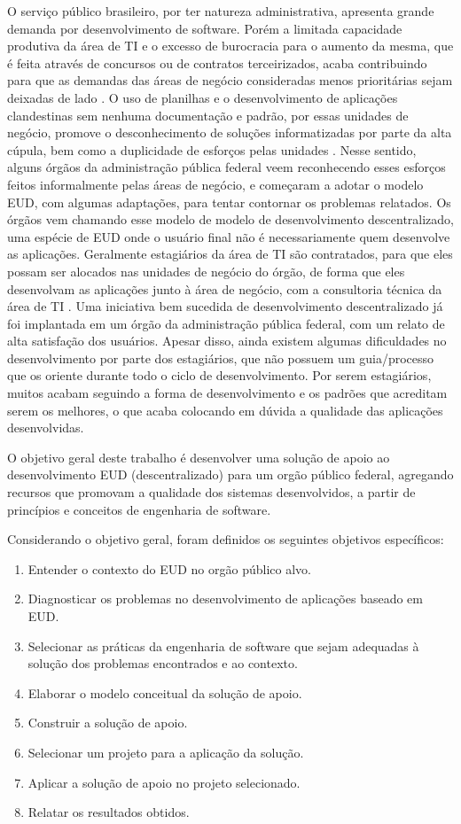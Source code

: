 O serviço público brasileiro, por ter natureza administrativa, apresenta grande demanda por desenvolvimento de software. Porém a limitada capacidade produtiva da área de TI e o excesso de burocracia para o aumento da mesma, que é feita através de concursos ou de contratos terceirizados, acaba contribuindo para que as demandas das áreas de negócio consideradas menos prioritárias sejam deixadas de lado \cite{artigoTcuGovTI}. O uso de planilhas e o desenvolvimento de aplicações clandestinas sem nenhuma documentação e padrão, por essas unidades de negócio, promove o desconhecimento de soluções informatizadas por parte da alta cúpula, bem como a duplicidade de esforços pelas unidades \cite{slideTCU}. Nesse sentido, alguns órgãos da administração pública federal veem reconhecendo esses esforços feitos informalmente pelas áreas de negócio, e começaram a adotar o modelo EUD, com algumas adaptações, para tentar contornar os problemas relatados. Os órgãos vem chamando esse modelo de modelo de desenvolvimento descentralizado, uma espécie de EUD onde o usuário final não é necessariamente quem desenvolve as aplicações. Geralmente estagiários da área de TI são contratados, para que eles possam ser alocados nas unidades de negócio do órgão, de forma que eles desenvolvam as aplicações junto à área de negócio, com a consultoria técnica da área de TI \cite{slideTCU}. Uma iniciativa bem sucedida de desenvolvimento descentralizado já foi implantada em um órgão da administração pública federal, com um relato de alta satisfação dos usuários. Apesar disso, ainda existem algumas dificuldades no desenvolvimento por parte dos estagiários, que não possuem um guia/processo que os oriente durante todo o ciclo de desenvolvimento. Por serem estagiários, muitos acabam seguindo a forma de desenvolvimento e os padrões que acreditam serem os melhores, o que acaba colocando em dúvida a qualidade das aplicações desenvolvidas. 

O objetivo geral deste trabalho é desenvolver uma solução de apoio ao desenvolvimento EUD (descentralizado) para um orgão público federal, agregando recursos que promovam a qualidade dos sistemas desenvolvidos, a partir de princípios e conceitos de engenharia de software.

Considerando o objetivo geral, foram definidos os seguintes objetivos específicos:

\begin{enumerate}
\item Entender o contexto do EUD no orgão público alvo.
\item Diagnosticar os problemas no desenvolvimento de aplicações baseado em EUD.
\item Selecionar as práticas da engenharia de software que sejam adequadas à solução dos problemas encontrados e ao contexto.
\item Elaborar o modelo conceitual da solução de apoio.
\item Construir a solução de apoio.
\item Selecionar um projeto para a aplicação da solução.
\item Aplicar a solução de apoio no projeto selecionado.
\item Relatar os resultados obtidos.
\end{enumerate}


